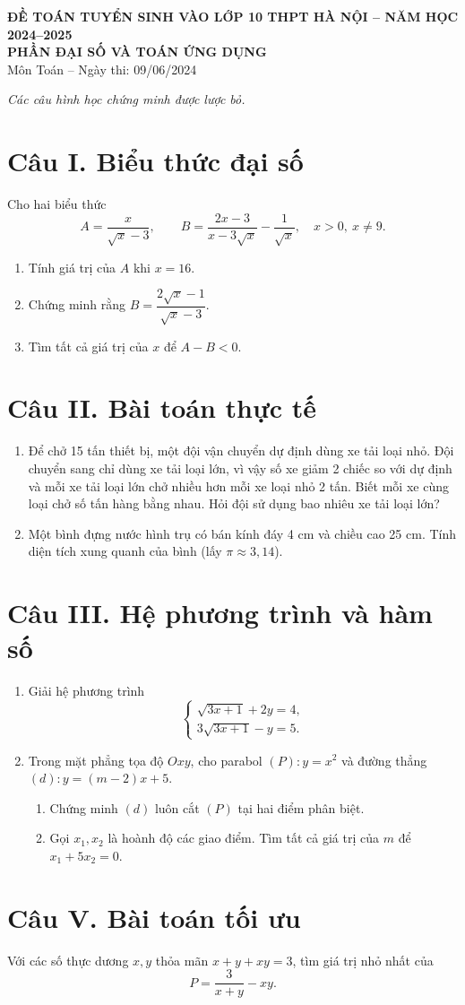 \documentclass[12pt,a4paper]{article}
\begin{document}
\begin{center}
{\Large\bfseries ĐỀ TOÁN TUYỂN SINH VÀO LỚP 10 THPT HÀ NỘI -- NĂM HỌC 2024--2025}\\[2pt]
{\large\bfseries PHẦN ĐẠI SỐ VÀ TOÁN ỨNG DỤNG}\\
Môn Toán -- Ngày thi: 09/06/2024
\end{center}

\textit{Các câu hình học chứng minh được lược bỏ.}

\section*{Câu I. Biểu thức đại số}
Cho hai biểu thức
\[
A=\frac{x}{\sqrt{x}-3},\qquad
B=\frac{2x-3}{x-3\sqrt{x}}-\frac1{\sqrt{x}},
\quad x>0,\ x\ne9.
\]
\begin{enumerate}
\item Tính giá trị của $A$ khi $x=16$.
\item Chứng minh rằng $B=\dfrac{2\sqrt{x}-1}{\sqrt{x}-3}$.
\item Tìm tất cả giá trị của $x$ để $A-B<0$.
\end{enumerate}

\section*{Câu II. Bài toán thực tế}
\begin{enumerate}
\item Để chở 15 tấn thiết bị, một đội vận chuyển dự định dùng xe tải loại nhỏ. Đội chuyển sang chỉ dùng xe tải loại lớn, vì vậy số xe giảm 2 chiếc so với dự định và mỗi xe tải loại lớn chở nhiều hơn mỗi xe loại nhỏ 2 tấn. Biết mỗi xe cùng loại chở số tấn hàng bằng nhau. Hỏi đội sử dụng bao nhiêu xe tải loại lớn?
\item Một bình đựng nước hình trụ có bán kính đáy 4 cm và chiều cao 25 cm. Tính diện tích xung quanh của bình (lấy $\pi\approx3{,}14$).
\end{enumerate}

\section*{Câu III. Hệ phương trình và hàm số}
\begin{enumerate}
\item Giải hệ phương trình
\[
\begin{cases}
\sqrt{3x+1}+2y=4,\\
3\sqrt{3x+1}-y=5.
\end{cases}
\]
\item Trong mặt phẳng tọa độ $Oxy$, cho parabol $(P):y=x^2$ và đường thẳng $(d):y=(m-2)x+5$.
\begin{enumerate}
\item Chứng minh $(d)$ luôn cắt $(P)$ tại hai điểm phân biệt.
\item Gọi $x_1,x_2$ là hoành độ các giao điểm. Tìm tất cả giá trị của $m$ để $x_1+5x_2=0$.
\end{enumerate}
\end{enumerate}

\section*{Câu V. Bài toán tối ưu}
Với các số thực dương $x,y$ thỏa mãn $x+y+xy=3$, tìm giá trị nhỏ nhất của
\[
P=\frac{3}{x+y}-xy.
\]
\end{document}
